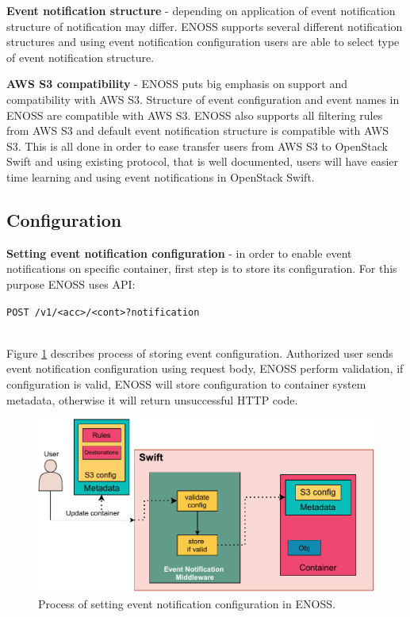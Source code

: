 \documentclass{ExcelAtFIT}
\begin{document}
\textbf{Event notification structure} - depending on application of event notification structure of notification may differ. ENOSS supports several different notification structures and using event notification configuration users are able to select type of event notification structure.

\textbf{AWS S3 compatibility} - ENOSS puts big emphasis on support and compatibility with AWS S3. Structure of event configuration and event names in ENOSS are compatible with AWS S3. ENOSS also supports all filtering rules from AWS S3 and default event notification structure is compatible with AWS S3. This is all done in order to ease transfer users from AWS S3 to OpenStack Swift and using existing protocol, that is well documented, users will have easier time learning and using event notifications in OpenStack Swift.

\subsection{Configuration}

\textbf{Setting event notification configuration} - in order to enable event notifications on specific container, first step is to store its configuration. For this purpose ENOSS uses API: \\\centerline{\texttt{POST /v1/<acc>/<cont>?notification}}\\Figure \ref{fig:postConfiguration} describes process of storing event configuration. Authorized user sends event notification configuration using request body, ENOSS perform validation, if configuration is valid, ENOSS will store configuration to container system metadata, otherwise it will return unsuccessful HTTP code.

\begin{figure}[t]
		\centering
		\includegraphics[width=0.90\linewidth]{images/swift-postconfiguration.pdf}
		\caption{Process of setting event notification configuration in ENOSS.}
		\label{fig:postConfiguration}
\end{figure}
\end{document}
